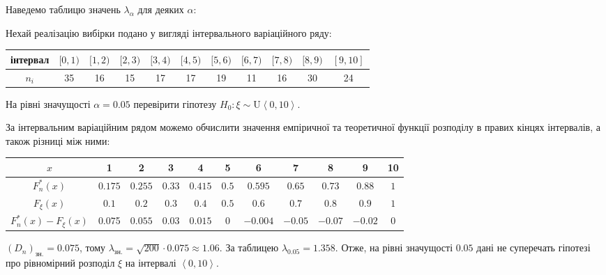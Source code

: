 Наведемо таблицю значень $\lambda_\alpha$ для деяких $\alpha$:
\begin{center}
    
\end{center}

\begin{example}
    Нехай реалізацію вибірки подано у вигляді інтервального 
    варіаційного ряду:
    \begin{center}
        \begin{tabular}{*{11}{|c}|}
            \hline
            інтервал & $[0,1)$ & $[1,2)$ & $[2,3)$ & $[3,4)$ & $[4,5)$ & $[5,6)$ & $[6,7)$ & $[7,8)$ & $[8,9)$ & $[9,10]$ \\
            \hline
            $n_i$ & 35 & 16 & 15 & 17 & 17 & 19 & 11 & 16 & 30 & 24 \\
            \hline
        \end{tabular}
    \end{center}
    На рівні значущості $\alpha = 0.05$ перевірити гіпотезу $H_0: \xi \sim \mathrm{U}\left<0, 10\right>$.

    За інтервальним варіаційним рядом можемо обчислити значення емпіричної та теоретичної функції розподілу в правих кінцях інтервалів,
    а також різниці між ними:
    \begin{center}
        \begin{tabular}{*{11}{|c}|}
            \hline
            $x$ & 1 & 2 & 3 & 4 & 5 & 6 & 7 & 8 & 9 & 10 \\
            \hline
            $F_n^*(x)$ & $0.175$ & $0.255$ & $0.33$ & $0.415$ & $0.5$ & $0.595$ & $0.65$ & $0.73$ & $0.88$ & $1$ \\
            \hline
            $F_\xi(x)$ & $0.1$ & $0.2$ & $0.3$ & $0.4$ & $0.5$ & $0.6$ & $0.7$ & $0.8$ & $0.9$ & $1$ \\
            \hline
            $F_n^*(x) - F_\xi(x)$ & $0.07$5 & $0.055$ & $0.03$ & $0.015$ & $0$ & $-0.004$ & $-0.05$ & $-0.07$ & $-0.02$ & $0$ \\
            \hline
        \end{tabular}
    \end{center}
    $\left(D_n\right)_{\text{зн.}} = 0.075$, тому $\lambda_{\text{зн.}} = \sqrt{200} \cdot 0.075 \approx 1.06$.
    За таблицею $\lambda_{0.05} = 1.358$. Отже, на рівні значущості $0.05$ дані не суперечать гіпотезі про рівномірний
    розподіл $\xi$ на інтервалі $\left<0, 10\right>$.
\end{example}